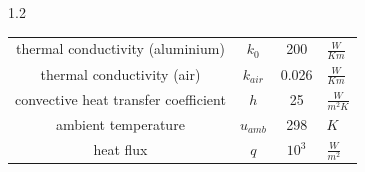 \documentclass[preview]{standalone}
\begin{document}
\begin{spacing}{1.2}
\begin{tabular}{cccl}
\toprule
thermal conductivity (aluminium) & $k_0$ & 200 & $\frac{W}{K m}$ \\
thermal conductivity (air) & $k_{air}$ & 0.026 & $\frac{W}{K m}$ \\
convective heat transfer coefficient & $h$ & 25 & $\frac{W}{m^2 K}$ \\
ambient temperature & $u_{amb}$ & 298 & $K$ \\
heat flux & $q$ & $10^3$ & $\frac{W}{m^2}$ \\
\bottomrule
\end{tabular}
\end{spacing}
\end{document}
